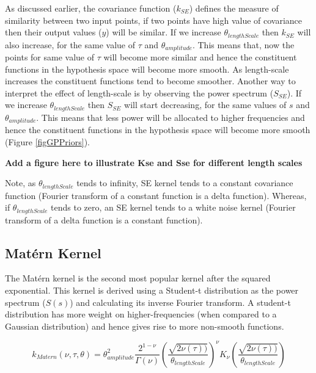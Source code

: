 As discussed earlier, the covariance function ($k_{SE}$) defines the measure of similarity between two input points, if two points have high value of covariance then their output values ($y$) will be similar. If we increase $\theta_{lengthScale}$ then $k_{SE}$ will also increase, for the same value of $\tau$ and $\theta_{amplitude}$. This means that, now the points for same value of $\tau$ will become more similar and hence the constituent functions in the hypothesis space will become more smooth. As length-scale increases the constituent functions tend to become smoother. Another way to interpret the effect of length-scale is by observing the power spectrum ($S_{SE}$). If we increase $\theta_{lengthScale}$ then $S_{SE}$ will start decreasing, for the same values of $s$ and $\theta_{amplitude}$. This means that less power will be allocated to higher frequencies and hence the constituent functions in the hypothesis space will become more smooth (Figure \ref{figGPPriors}). 

\textbf{Add a figure here to illustrate Kse and Sse for different length scales}

Note, as $\theta_{lengthScale}$ tends to infinity, SE kernel tends to a constant covariance function (Fourier transform of a constant function is a delta function). Whereas, if $\theta_{lengthScale}$ tends to zero, an SE kernel tends to a white noise kernel (Fourier transform of a delta function is a constant function).

\subsection{Mat\'ern Kernel}\label{subsecCh4MaternKernel}
The Mat\'ern kernel is the second most popular kernel after the squared exponential. This kernel is derived using a Student-t distribution as the power spectrum ($S(s)$) and calculating its inverse Fourier transform. A student-t distribution has more weight on higher-frequencies (when compared to a Gaussian distribution) and hence gives rise to more non-smooth functions. 

\begin{equation}
k_{Matern}(\nu, \tau, \theta) = \theta_{amplitude}^2\frac{2^{1- \nu }}{\Gamma (\nu)}\left ( \frac{\sqrt{2\nu(\tau))}}{\theta_{lengthScale}} \right )^{\nu}K_{\nu}\left ( \frac{\sqrt{2\nu(\tau))}}{\theta_{lengthScale}} \right)
\end{equation}

